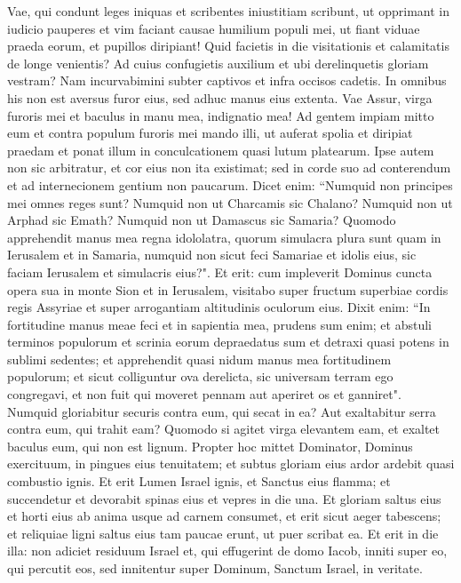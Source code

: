 \begin{biblechapter}  
\verse Vae, qui condunt leges iniquas et scribentes iniustitiam scribunt, 
\verse ut opprimant in iudicio pauperes et vim faciant causae humilium populi mei, ut fiant viduae praeda eorum, et pupillos diripiant! 
\verse Quid facietis in die visitationis et calamitatis de longe venientis? Ad cuius confugietis auxilium et ubi derelinquetis gloriam vestram? 
\verse Nam incurvabimini subter captivos et infra occisos cadetis. In omnibus his non est aversus furor eius, sed adhuc manus eius extenta. 
\verse Vae Assur, virga furoris mei et baculus in manu mea, indignatio mea! 
\verse Ad gentem impiam mitto eum et contra populum furoris mei mando illi, ut auferat spolia et diripiat praedam et ponat illum in conculcationem quasi lutum platearum. 
\verse Ipse autem non sic arbitratur, et cor eius non ita existimat; sed in corde suo ad conterendum et ad internecionem gentium non paucarum. 
\verse Dicet enim: “Numquid non principes mei omnes reges sunt? 
\verse Numquid non ut Charcamis sic Chalano? Numquid non ut Arphad sic Emath? Numquid non ut Damascus sic Samaria? 
\verse Quomodo apprehendit manus mea regna idololatra, quorum simulacra plura sunt quam in Ierusalem et in Samaria, 
\verse numquid non sicut feci Samariae et idolis eius, sic faciam Ierusalem et simulacris eius?". 
\verse Et erit: cum impleverit Dominus cuncta opera sua in monte Sion et in Ierusalem, visitabo super fructum superbiae cordis regis Assyriae et super arrogantiam altitudinis oculorum eius. 
\verse Dixit enim: “In fortitudine manus meae feci et in sapientia mea, prudens sum enim; et abstuli terminos populorum et scrinia eorum depraedatus sum et detraxi quasi potens in sublimi sedentes; 
\verse et apprehendit quasi nidum manus mea fortitudinem populorum; et sicut colliguntur ova derelicta, sic universam terram ego congregavi, et non fuit qui moveret pennam aut aperiret os et ganniret". 
\verse Numquid gloriabitur securis contra eum, qui secat in ea? Aut exaltabitur serra contra eum, qui trahit eam? Quomodo si agitet virga elevantem eam, et exaltet baculus eum, qui non est lignum. 
\verse Propter hoc mittet Dominator, Dominus exercituum, in pingues eius tenuitatem; et subtus gloriam eius ardor ardebit quasi combustio ignis. 
\verse Et erit Lumen Israel ignis, et Sanctus eius flamma; et succendetur et devorabit spinas eius et vepres in die una. 
\verse Et gloriam saltus eius et horti eius ab anima usque ad carnem consumet, et erit sicut aeger tabescens; 
\verse et reliquiae ligni saltus eius tam paucae erunt, ut puer scribat ea. 
\verse Et erit in die illa: non adiciet residuum Israel et, qui effugerint de domo Iacob, inniti super eo, qui percutit eos, sed innitentur super Dominum, Sanctum Israel, in veritate. 

\end{biblechapter}
